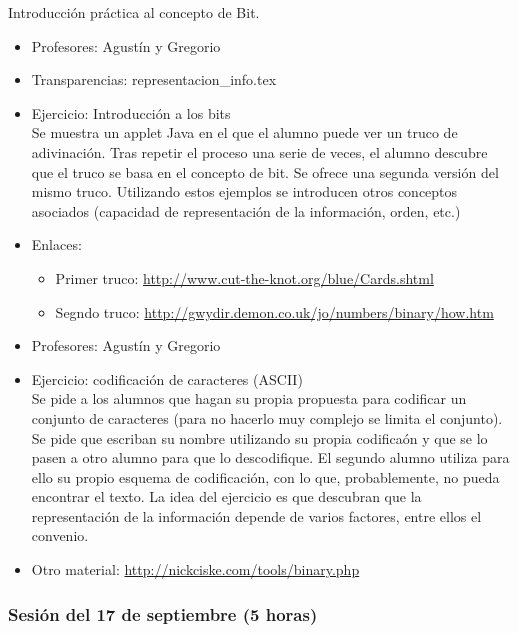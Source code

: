 \documentclass[a4paper,12pt]{article}
\begin{document}
Introducción práctica al concepto de Bit.
\begin{itemize}
\item Profesores: Agustín y Gregorio
\item Transparencias: representacion\_info.tex
\item Ejercicio: Introducción a los bits \\
  Se muestra un applet Java en el que el alumno puede ver un truco de adivinación. Tras repetir el proceso una serie de veces, el alumno descubre que el truco se basa en el concepto de bit. Se ofrece una segunda versión del mismo truco. Utilizando estos ejemplos se introducen otros conceptos asociados (capacidad de representación de la información, orden, etc.)
\item Enlaces:
  \begin{itemize}
  \item Primer truco: \url{http://www.cut-the-knot.org/blue/Cards.shtml}
  \item Segndo truco: \url{http://gwydir.demon.co.uk/jo/numbers/binary/how.htm}
  \end{itemize}
\end{itemize}

\begin{itemize}
\item Profesores: Agustín y Gregorio
\item Ejercicio: codificación de caracteres (ASCII) \\
Se pide a los alumnos que hagan su propia propuesta para codificar un conjunto de caracteres (para no hacerlo muy complejo se limita el conjunto). Se pide que escriban su nombre utilizando su propia codificaón y que se lo pasen a otro alumno para que lo descodifique. El segundo alumno utiliza para ello su propio esquema de codificación, con lo que, probablemente, no pueda encontrar el texto. La idea del ejercicio es que descubran que la representación de la información depende de varios factores, entre ellos el convenio.
\item Otro material: \url{http://nickciske.com/tools/binary.php}
\end{itemize}

\subsubsection{Sesión del 17 de septiembre (5 horas)}
\end{document}
